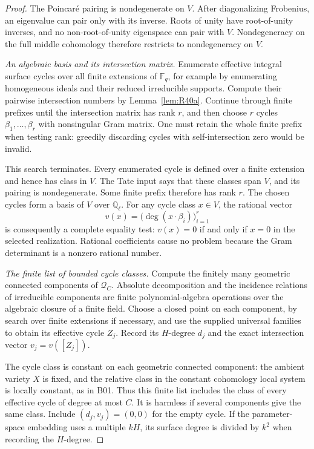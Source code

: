 \begin{proof}
The Poincar\'e pairing is nondegenerate on $V$. After diagonalizing
Frobenius, an eigenvalue can pair only with its inverse. Roots of unity
have root-of-unity inverses, and no non-root-of-unity eigenspace can
pair with $V$. Nondegeneracy on the full middle cohomology therefore
restricts to nondegeneracy on $V$.

\emph{An algebraic basis and its intersection matrix.}
Enumerate effective integral surface cycles over all finite extensions
of $\mathbb F_q$, for example by enumerating homogeneous ideals and
their reduced irreducible supports. Compute their pairwise intersection
numbers by Lemma~\ref{lem:R40a}. Continue through finite prefixes until
the intersection matrix has rank $r$, and then choose $r$ cycles
$\beta_1,\ldots,\beta_r$ with nonsingular Gram matrix.
One must retain the whole finite prefix when testing rank: greedily
discarding cycles with self-intersection zero would be invalid.

This search terminates. Every enumerated cycle is defined over a finite
extension and hence has class in $V$. The Tate input says that these
classes span $V$, and its pairing is nondegenerate. Some finite prefix
therefore has rank $r$. The chosen cycles form a basis of $V$ over
$\mathbb Q_\ell$. For any cycle class $x\in V$, the rational vector
\[
                   v(x)=\bigl(\deg(x\cdot\beta_i)\bigr)_{i=1}^r
\]
is consequently a complete equality test: $v(x)=0$ if and only if
$x=0$ in the selected realization. Rational coefficients cause no
problem because the Gram determinant is a nonzero rational number.

\emph{The finite list of bounded cycle classes.}
Compute the finitely many geometric connected components of
$\mathcal Q_C$. Absolute decomposition and the incidence relations of
irreducible components are finite polynomial-algebra operations over
the algebraic closure of a finite field. Choose a closed point on each
component, by search over finite extensions if necessary, and use the
supplied universal families to obtain its effective cycle $Z_j$.
Record its $H$-degree $d_j$ and the exact intersection vector
$v_j=v([Z_j])$.

The cycle class is constant on each geometric connected component:
the ambient variety $X$ is fixed, and the relative class in the constant
cohomology local system is locally constant, as in B01. Thus this finite
list includes the class of every effective cycle of degree at most
$C$. It is harmless if several components give the same class. Include
$(d_j,v_j)=(0,0)$ for the empty cycle. If the parameter-space embedding
uses a multiple $kH$, its surface degree is divided by $k^2$ when
recording the $H$-degree.


\end{proof}

